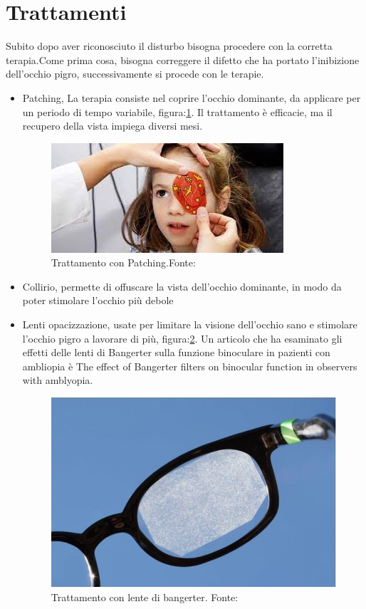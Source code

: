 \documentclass[
a4paper,
cleardoublepage=empty,
headings=twolinechapter,
numbers=autoenddot,
]{scrbook}
\begin{document}
	\section{Trattamenti}
	Subito dopo aver riconosciuto il disturbo bisogna procedere con la corretta terapia.Come prima cosa, bisogna correggere il difetto che ha portato l'inibizione dell'occhio pigro, successivamente si procede con le terapie.
	\begin{itemize}
		\item Patching\cite{patching}, La terapia consiste nel coprire l'occhio dominante, da applicare per un periodo di tempo variabile, figura:\ref{fig:patching}.
		Il trattamento è efficacie, ma il recupero della vista impiega diversi mesi.       	   
		\begin{figure}[H]
			\centering
			\includegraphics[width=0.5\linewidth]{image/patching}
			\caption{Trattamento con Patching.Fonte:\cite{Patching_image}}
			\label{fig:patching}
		\end{figure}	
		\item Collirio, permette di offuscare la vista dell'occhio dominante, in modo da poter stimolare l'occhio più debole
		\item Lenti opacizzazione, usate per limitare la visione dell'occhio sano e stimolare l'occhio pigro a lavorare di più, figura:\ref{fig:penalizzazione-ottica}. Un articolo che ha esaminato gli effetti delle lenti di Bangerter sulla funzione binoculare in pazienti con ambliopia è The effect of Bangerter filters on binocular function in observers with amblyopia\cite{filtro}.
		\begin{figure}[h]
			\centering
			\includegraphics[width=0.4\linewidth]{image/penalizzazione ottica}
			\caption{Trattamento con lente di bangerter.
				Fonte:\cite{Bangerter_image}}
			\label{fig:penalizzazione-ottica}
		\end{figure}
		

\end{itemize}
\end{document}

